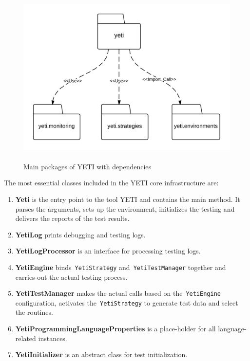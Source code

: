 \bigskip
\begin{figure}[h]
	\centering
	\includegraphics[width=14cm, height=9cm]{chapter3/yetiStructure.png}
	\smallskip
	\caption{Main packages of YETI with dependencies }
	\label{fig:yetiCore}
\end{figure}
\bigskip
\bigskip
\bigskip
The most essential classes included in the YETI core infrastructure are:
\begin{enumerate}
\item {\textbf{Yeti}} is the entry point to the tool YETI and contains the main method. It parses the arguments, sets up the environment, initializes the testing and delivers the reports of the test results.
\item {\textbf{YetiLog}} prints debugging and testing logs. 
\item {\textbf{YetiLogProcessor}} is an interface for processing testing logs.
\item {\textbf{YetiEngine}} binds~\verb+YetiStrategy+ and~\verb+YetiTestManager+ together and carries-out the actual testing process.
\item {\textbf{YetiTestManager}} makes the actual calls based on the~\verb+YetiEngine+ configuration, activates the~\verb+YetiStrategy+ to generate test data and select the routines.
\item {\textbf{YetiProgrammingLanguageProperties}} is a place-holder for all language-related instances.
\item {\textbf{YetiInitializer}} is an abstract class for test initialization.
\end{enumerate}

